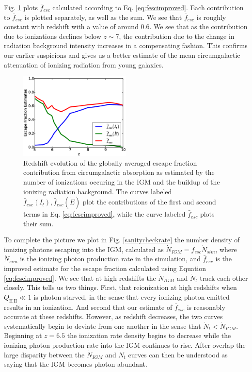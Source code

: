 Fig. \ref{RadEscFraction} plots $\bar{f}_{esc}$ calculated according to Eq. \eqref{eq:fescimproved}. Each contribution to $\bar{f}_{esc}$ is plotted separately, as well as the sum. We see that $\bar{f}_{esc}$ is roughly constant with redshift with a value of around 0.6. We see that as the contribution due to ionizations declines below $z\sim 7$, the contribution due to the change in radiation background intensity increases in a compensating fashion. This confirms our earlier suspicions and gives us a better estimate of the mean circumgalactic attenuation of ionizing radiation from young galaxies. 

\begin{figure}
	\includegraphics[width=0.5\textwidth]{RadEscFraction.eps}
	\caption{Redshift evolution of the globally averaged escape fraction contribution from circumgalactic absorption as estimated by the number of ionizations occuring in the IGM and the buildup of the ionizing radiation background. The curves labeled $\bar{f}_{esc}(I_t), \bar{f}_{esc}(\dot{E})$ plot the contributions of the first and second terms in Eq. \eqref{eq:fescimproved}, while the curve labeled $\bar{f}_{esc}$ plots their sum.}
	\label{RadEscFraction}
\end{figure}

To complete the picture we plot in Fig. \ref{sanitycheckrate} the number density of ionizing photons escaping into the IGM, calculated as $\dot{N}_{IGM}=\bar{f}_{esc}\dot{N}_{sim}$, where $\dot{N}_{sim}$ is the ionizing photon production rate in the simulation, and  $\bar{f}_{esc}$ is the improved estimate for the escape fraction calculated using Equation \eqref{eq:fescimproved}. We see that at high redshifts the $\dot{N}_{IGM}$ and $\dot{N}_t$ track each other closely. This tells us two things. First, that reionization at high redshifts when $Q_{\mathrm{H\,II}} \ll 1$ is photon starved, in the sense that every ionizing photon emitted results in an ionization. And second that our estimate of $\bar{f}_{esc}$ is reasonably accurate at these redshifts. However, as redshift decreases, the two curves systematically begin to deviate from one another in the sense that $\dot{N}_t < \dot{N}_{IGM}$. Beginning at $z = 6.5$ the ionization rate density begins to decrease while the ionizing photon production rate into the IGM continues to rise. 
After overlap the large disparity between the $\dot{N}_{IGM}$ and $\dot{N}_t$ curves can then be understood as saying that the IGM becomes photon abundant. 

